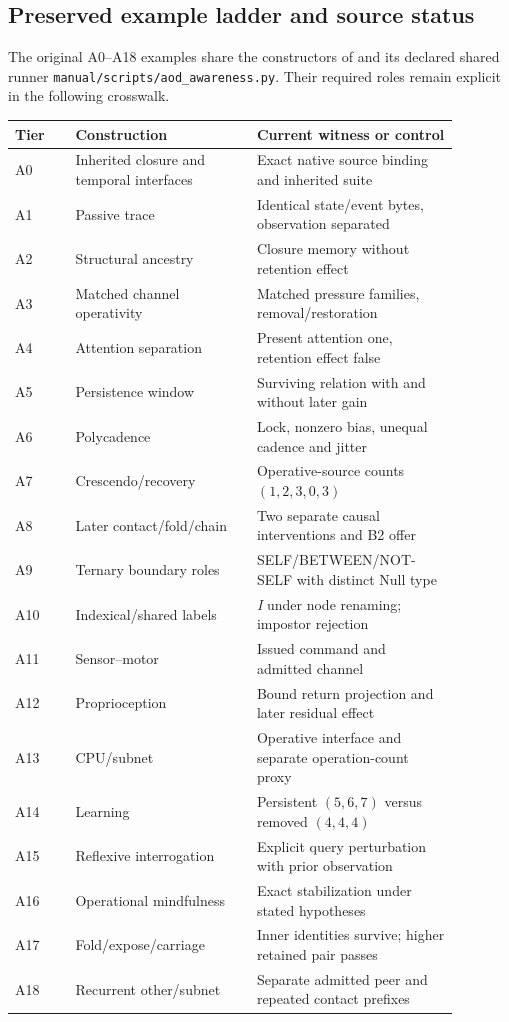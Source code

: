 \subsection{Preserved example ladder and source status}
The original A0--A18 examples share the constructors of
 and its declared shared runner
\texttt{manual/scripts/aod\_awareness.py}. Their required
roles remain explicit in the following crosswalk.
\begin{longtable}{p{0.12\linewidth}p{0.36\linewidth}p{0.40\linewidth}}
\toprule Tier & Construction & Current witness or control\\\midrule
\endhead
A0 & Inherited closure and temporal interfaces & Exact native source binding and inherited suite\\
A1 & Passive trace & Identical state/event bytes, observation separated\\
A2 & Structural ancestry & Closure memory without retention effect\\
A3 & Matched channel operativity & Matched pressure families, removal/restoration\\
A4 & Attention separation & Present attention one, retention effect false\\
A5 & Persistence window & Surviving relation with and without later gain\\
A6 & Polycadence & Lock, nonzero bias, unequal cadence and jitter\\
A7 & Crescendo/recovery & Operative-source counts \((1,2,3,0,3)\)\\
A8 & Later contact/fold/chain & Two separate causal interventions and B2 offer\\
A9 & Ternary boundary roles & SELF/BETWEEN/NOT-SELF with distinct Null type\\
A10 & Indexical/shared labels & \emph{I} under node renaming; impostor rejection\\
A11 & Sensor--motor & Issued command and admitted channel\\
A12 & Proprioception & Bound return projection and later residual effect\\
A13 & CPU/subnet & Operative interface and separate operation-count proxy\\
A14 & Learning & Persistent \((5,6,7)\) versus removed \((4,4,4)\)\\
A15 & Reflexive interrogation & Explicit query perturbation with prior observation\\
A16 & Operational mindfulness & Exact stabilization under stated hypotheses\\
A17 & Fold/expose/carriage & Inner identities survive; higher retained pair passes\\
A18 & Recurrent other/subnet & Separate admitted peer and repeated contact prefixes\\
\bottomrule
\end{longtable}


